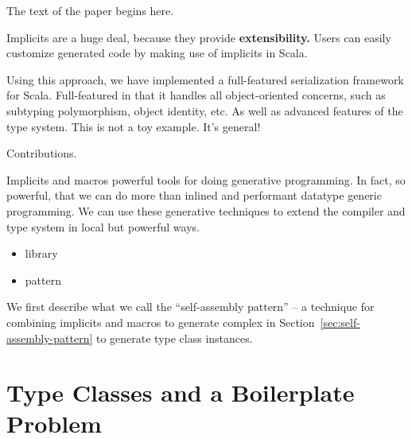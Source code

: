\documentclass[preprint]{sigplanconf}
\begin{document}






The text of the paper begins here.~\cite{ComparingGPHaskellRodriquez, ComparingGPHaskellHinze, ScalaGenericProgrammers, RepLib, OOGP}

Implicits are a huge deal, because they provide \textbf{extensibility.} Users can easily customize generated code by making use of implicits in Scala.

Using this approach, we have implemented a full-featured serialization framework for Scala. Full-featured in that it handles all object-oriented concerns, such as subtyping polymorphism, object identity, etc. As well as advanced features of the type system. This is not a toy example. It's general!

Contributions.

Implicits and macros powerful tools for doing generative programming. In fact, so powerful, that we can do more than inlined and performant datatype generic programming. We can use these generative techniques to extend the compiler and type system in local but powerful ways.

\begin{itemize}
\item library
\item pattern
\end{itemize}

We first describe what we call the ``self-assembly pattern'' -- a technique for combining implicits and macros to generate complex in Section~\ref{sec:self-assembly-pattern} to generate type class instances.

\section{Type Classes and a Boilerplate Problem}
\label{sec:background}
\end{document}
